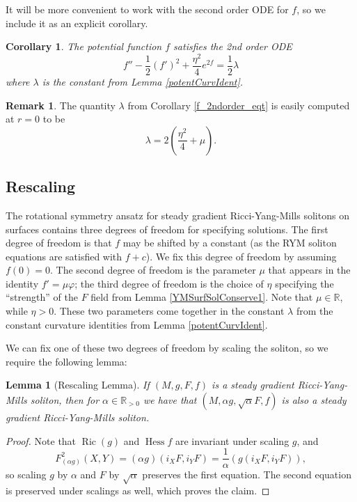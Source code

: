 \documentclass[12pt, a4paper, reqno, oneside]{amsart}
\newcommand{\R}{\mathbb{R}}
\renewcommand{\phi}{\varphi}
\DeclareMathOperator{\Hess}{Hess}
\DeclareMathOperator{\Ric}{Ric}
\numberwithin{equation}{section}
\theoremstyle{plain}
\newtheorem{lemma}[theorem]{Lemma}
\newtheorem{corollary}[theorem]{Corollary}
\theoremstyle{definition}
\newtheorem{remark}[theorem]{Remark}
\theoremstyle{plain}
\begin{document}
It will be more convenient to work with the second order ODE for $f$, so we include it as an explicit corollary.
\begin{corollary}
  The potential function $f$ satisfies the 2nd order ODE
  \begin{equation}\label{f_2ndorder_eqt}
    f''-\frac{1}{2}(f')^{2}+\frac{\eta^2}{4} e^{2f} = \frac{1}{2}\lambda
  \end{equation}
  where $\lambda$ is the constant from Lemma \ref{potentCurvIdent}.
\end{corollary}

\begin{remark}
  The quantity $\lambda$ from Corollary \ref{f_2ndorder_eqt} is easily computed at $r=0$ to be
  \[
    \lambda=2\left(\frac{\eta^{2}}{4}+\mu\right).
  \]
\end{remark}

\subsection{Rescaling}
The rotational symmetry ansatz for steady gradient Ricci-Yang-Mills solitons on surfaces contains three degrees of freedom for specifying solutions. The first degree of freedom is that $f$ may be shifted by a constant (as the RYM soliton equations are satisfied with $f+c$). We fix this degree of freedom by assuming $f(0)=0$. The second degree of freedom is the parameter $\mu$ that appears in the identity $f'=\mu\phi$; the third degree of freedom is the choice of $\eta$ specifying the ``strength'' of the $F$ field from Lemma \ref{YMSurfSolConserve1}. Note that $\mu\in\R$, while $\eta>0$. These two parameters come together in the constant $\lambda$ from the constant curvature identities from Lemma \ref{potentCurvIdent}.

We can fix one of these two degrees of freedom by scaling the soliton, so we require the following lemma:
\begin{lemma}[Rescaling Lemma]\label{rescaling_lemma}
  If $(M,g,F,f)$ is a steady gradient Ricci-Yang-Mills soliton, then for $\alpha\in\R_{> 0}$ we have that $(M,\alpha g, \sqrt{\alpha}F, f)$ is also a steady gradient Ricci-Yang-Mills soliton.
\end{lemma}
\begin{proof}
  Note that $\Ric(g)$ and $\Hess f$ are invariant under scaling $g$, and 
  \[
    F^{2}_{(\alpha g)}(X,Y) = (\alpha g)(i_{X}F,i_{Y}F) = \frac{1}{\alpha}(g(i_{X}F,i_{Y}F)),
  \]
  so scaling $g$ by $\alpha$ and $F$ by $\sqrt{\alpha}$ preserves the first equation. The second equation is preserved under scalings as well, which proves the claim.
\end{proof}
\end{document}
